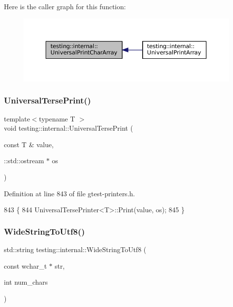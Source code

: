 Here is the caller graph for this function\+:
\nopagebreak
\begin{figure}[H]
\begin{center}
\leavevmode
\includegraphics[width=350pt]{namespacetesting_1_1internal_ad896a4e4d9133ce43dc18b6038d95dc3_icgraph}
\end{center}
\end{figure}
\mbox{\label{namespacetesting_1_1internal_afa92f5a284929dc3723e654a25feb7b9}} 
\subsubsection{\texorpdfstring{Universal\+Terse\+Print()}{UniversalTersePrint()}}
{\footnotesize\ttfamily template$<$typename T $>$ \\
void testing\+::internal\+::\+Universal\+Terse\+Print (\begin{DoxyParamCaption}\item[{const T \&}]{value,  }\item[{\+::std\+::ostream $\ast$}]{os }\end{DoxyParamCaption})}



Definition at line 843 of file gtest-\/printers.\+h.


\begin{DoxyCode}
843                                                          \{
844   UniversalTersePrinter<T>::Print(value, os);
845 \}
\end{DoxyCode}
\mbox{\label{namespacetesting_1_1internal_a05b8c86ff38243f34d8f839a0eadefb1}} 
\subsubsection{\texorpdfstring{Wide\+String\+To\+Utf8()}{WideStringToUtf8()}}
{\footnotesize\ttfamily std\+::string testing\+::internal\+::\+Wide\+String\+To\+Utf8 (\begin{DoxyParamCaption}\item[{const wchar\+\_\+t $\ast$}]{str,  }\item[{int}]{num\+\_\+chars }\end{DoxyParamCaption})}



